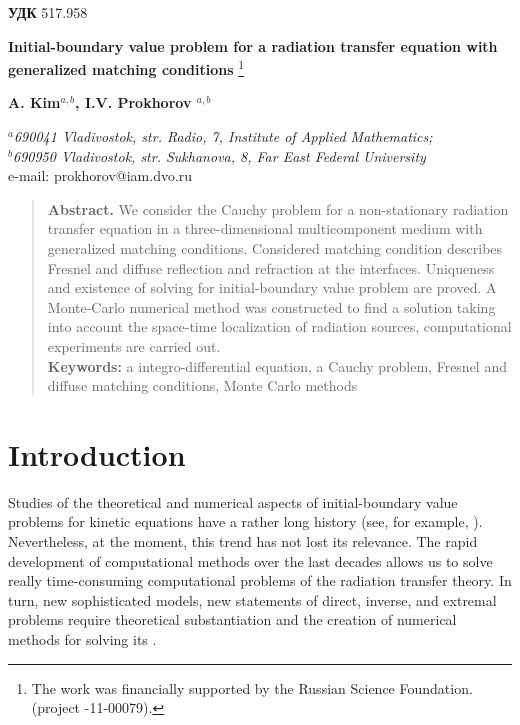 \documentclass[12pt,reqno]{report}
\begin{document}
	
	
	
	{\bf УДК} 517.958 \vskip0.2cm
	
	
	\begin{center}
		{\bf \large Initial-boundary value
		problem for a radiation transfer equation
		with generalized matching conditions }
		\footnote[1]{The work was financially supported by the Russian Science Foundation. (project -11-00079).}
	\end{center}
	\begin{center}
		{\bf A. Kim$^{a,b}$, I.V. Prokhorov $^{a,b}$ }
	\end{center}
	\begin{center}
		{\it ${}^a$690041 Vladivostok, str. Radio, 7, Institute of Applied Mathematics; \\ ${}^b$690950 Vladivostok, str. Sukhanova, 8,
			Far East Federal University}\\
		e-mail: prokhorov@iam.dvo.ru
	\end{center}
	\begin{quote}
		{\bf Abstract.} 
		We consider the Cauchy problem for a non-stationary radiation 
		transfer equation in a three-dimensional multicomponent medium 
		with generalized matching conditions. 
Considered matching condition describes 
                                Fresnel and diffuse reflection and refraction at the interfaces. 
		Uniqueness and existence of solving for initial-boundary value problem are proved. 
		A Monte-Carlo numerical method was constructed to find a solution taking 
		into account the space-time localization of radiation sources, 
		computational experiments are carried out.\\
		{\bf Keywords:} 
		a integro-differential equation, a Cauchy problem,
		Fresnel and diffuse matching conditions,
		Monte Carlo methods
	\end{quote}
	
	\section{Introduction}
	
	\setcounter{equation}{0}
	\setcounter{definition}{0}\setcounter{lemma}{0}\setcounter{theorem}{0}
	\setcounter{corollary}{0}\setcounter{remark}{0}

 	
Studies of the theoretical and numerical aspects of initial-boundary value problems for kinetic equations have a rather long history (see, for example, \cite{1,2,3,4,5}). Nevertheless, at the moment, this trend has not lost its relevance. The rapid development of   %
computational methods over the last decades allows us to solve really time-consuming computational problems of the radiation transfer theory. In turn, new sophisticated models, new statements of direct, inverse, and extremal problems require theoretical substantiation and the creation of numerical methods for solving its \cite{6,7,8,9,10,11,12,13,14,15,16,17,18}.
\end{document}
